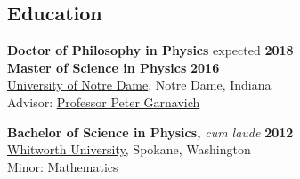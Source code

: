 \documentclass[margin]{res}
\begin{document}
\begin{resume}

\section{Education}

{\bf Doctor of Philosophy in Physics} \hfill expected {\bf 2018}\\
{\bf Master of Science in Physics} \hfill  {\bf 2016}\\
\href{http://physics.nd.edu}{University of Notre Dame}, Notre Dame, Indiana \\ 
Advisor: \href{http://www.nd.edu/~pgarnavi}{Professor Peter Garnavich}



{\bf Bachelor of Science in Physics,} \textit{cum laude} \hfill \textbf{2012}\\
\href{http://www.whitworth.edu/physics/}{Whitworth University}, Spokane, Washington \\ 
Minor: Mathematics
 



\end{resume}
\end{document}
